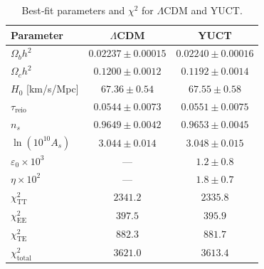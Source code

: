 \documentclass[11pt,a4paper]{article}
\begin{document}
	\begin{table}[H]
		\centering
		\caption{Best‑fit parameters and $\chi^2$ for $\Lambda$CDM and YUCT.}
		\label{tab:results}
		\LARGE
		\begin{tabular}{lcc}
			\toprule
			Parameter & $\Lambda$CDM & YUCT \\
			\midrule
			$\Omega_b h^2$ & $0.02237 \pm 0.00015$ & $0.02240 \pm 0.00016$ \\
			$\Omega_c h^2$ & $0.1200 \pm 0.0012$ & $0.1192 \pm 0.0014$ \\
			$H_0$ [km/s/Mpc] & $67.36 \pm 0.54$ & $67.55 \pm 0.58$ \\
			$\tau_{\mathrm{reio}}$ & $0.0544 \pm 0.0073$ & $0.0551 \pm 0.0075$ \\
			$n_s$ & $0.9649 \pm 0.0042$ & $0.9653 \pm 0.0045$ \\
			$\ln(10^{10}A_s)$ & $3.044 \pm 0.014$ & $3.048 \pm 0.015$ \\
			$\varepsilon_0 \times 10^3$ & — & $1.2 \pm 0.8$ \\
			$\eta \times 10^2$ & — & $1.8 \pm 0.7$ \\
			\midrule
			$\chi^2_{\mathrm{TT}}$ & $2341.2$ & $2335.8$ \\
			$\chi^2_{\mathrm{EE}}$ & $397.5$ & $395.9$ \\
			$\chi^2_{\mathrm{TE}}$ & $882.3$ & $881.7$ \\
			$\chi^2_{\mathrm{total}}$ & $3621.0$ & $3613.4$ \\
			\bottomrule
		\end{tabular}
	\end{table}
	
\end{document}
